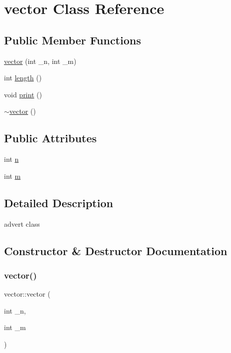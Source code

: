 \hypertarget{classvector}{}\section{vector Class Reference}
\label{classvector}
\subsection*{Public Member Functions}
\begin{DoxyCompactItemize}
\item 
\hyperlink{classvector_adf5691a6cee44dec7c6acfa58039a0d1}{vector} (int \+\_\+n, int \+\_\+m)
\item 
int \hyperlink{classvector_af227c6b920f64fded51b56cd0c26e8f5}{length} ()
\item 
void \hyperlink{classvector_a53c6b3d32c7120f215925023b38ed8fd}{print} ()
\item 
\hyperlink{classvector_a7f8c4cd49dff8799dd98cb3e84242eda}{$\sim$vector} ()
\end{DoxyCompactItemize}
\subsection*{Public Attributes}
\begin{DoxyCompactItemize}
\item 
int \hyperlink{classvector_a0bd97601c84f33258823f44184f94404}{n}
\item 
int \hyperlink{classvector_a1e27b3cada38776acca9d001711d4fa2}{m}
\end{DoxyCompactItemize}


\subsection{Detailed Description}
advert class 

\subsection{Constructor \& Destructor Documentation}
\hypertarget{classvector_adf5691a6cee44dec7c6acfa58039a0d1}{}\label{classvector_adf5691a6cee44dec7c6acfa58039a0d1} 
\subsubsection{\texorpdfstring{vector()}{vector()}}
{\footnotesize\ttfamily vector\+::vector (\begin{DoxyParamCaption}\item[{int}]{\+\_\+n,  }\item[{int}]{\+\_\+m }\end{DoxyParamCaption})\hspace{0.3cm}{\ttfamily [inline]}}


